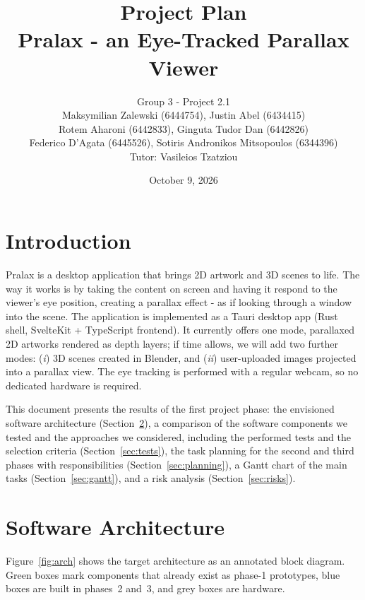 \documentclass[11pt,a4paper]{article}
\title{\vspace{-1.2cm}Project Plan\\[1.5mm]
\large Pralax - an Eye-Tracked Parallax Viewer}
\author{Group 3 - Project 2.1\\
Maksymilian Zalewski (6444754), Justin Abel (6434415)\\ Rotem Aharoni (6442833), Ginguta Tudor Dan (6442826)\\ Federico D'Agata (6445526), Sotiris Andronikos Mitsopoulos (6344396)\\[1.5mm]
Tutor: Vasileios Tzatziou}
\date{October 9, 2026}
\begin{document}
\maketitle
\vspace{-8mm}

\section{Introduction}
\label{sec:intro}

Pralax is a desktop application that brings 2D artwork and 3D scenes to life. The way it works is by taking the content on screen and having it respond to the viewer's eye position, creating a parallax effect - as if looking through a window into the scene. The application is
implemented as a Tauri desktop app (Rust shell, SvelteKit + TypeScript frontend).
It currently offers one mode, parallaxed 2D artworks rendered as depth layers;
if time allows, we will add two further modes:
(\textit{i}) 3D scenes created in Blender, and
(\textit{ii}) user-uploaded images projected into a parallax view.
The eye tracking is performed with a regular webcam, so no dedicated hardware is
required.

This document presents the results of the first project phase: the envisioned
software architecture (Section~\ref{sec:arch}), a comparison of the software
components we tested and the approaches we considered, including the performed
tests and the selection criteria (Section~\ref{sec:tests}), the task planning
for the second and third phases with responsibilities
(Section~\ref{sec:planning}), a Gantt chart of the main tasks
(Section~\ref{sec:gantt}), and a risk analysis (Section~\ref{sec:risks}).

\section{Software Architecture}
\label{sec:arch}

Figure~\ref{fig:arch} shows the target architecture as an annotated block
diagram. Green boxes mark components that already exist as phase-1
prototypes, blue boxes are built in phases~2 and~3, and grey boxes are
hardware.
\end{document}
